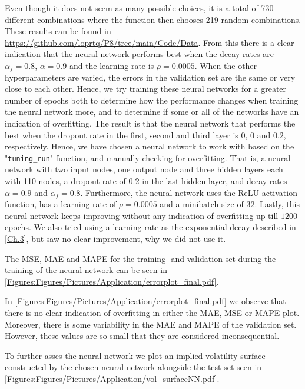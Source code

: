 Even though it does not seem as many possible choices, it is a total of 730 different combinations where the function then chooses 219 random combinations. These results can be found in \url{https://github.com/loprtq/P8/tree/main/Code/Data}. From this there is a clear indication that the neural network performs best when the decay rates are $\alpha_f = 0.8$, $\alpha = 0.9$ and the learning rate is $\rho = 0.0005$. When the other hyperparameters are varied, the errors in the validation set are the same or very close to each other. Hence, we try training these neural networks for a greater number of epochs both to determine how the performance changes when training the neural network more, and to determine if some or all of the networks have an indication of overfitting. The result is that the neural network that performs the best when the dropout rate in the first, second and third layer is $0$, $0$ and $0.2$, respectively. Hence, we have chosen a neural network to work with based on the "\lstinline{tuning_run}" function, and manually checking for overfitting. That is, a neural network with two input nodes, one output node and three hidden layers each with 110 nodes, a dropout rate of $0.2$ in the last hidden layer, and decay rates $\alpha = 0.9$ and $\alpha_f = 0.8$. Furthermore, the neural network uses the ReLU activation function, has a learning rate of $\rho = 0.0005$ and a minibatch size of $32$. Lastly, this neural network keeps improving without any indication of overfitting up till $1200$ epochs. We also tried using a learning rate as the exponential decay described in \autoref{Ch.3}, but saw no clear improvement, why we did not use it.

The MSE, MAE and MAPE for the training- and validation set during the training of the neural network can be seen in \autoref{Figures:Figures/Pictures/Application/errorplot_final.pdf}.

In \autoref{Figures:Figures/Pictures/Application/errorplot_final.pdf} we observe that there is no clear indication of overfitting in either the MAE, MSE or MAPE plot. Moreover, there is some variability in the MAE and MAPE of the validation set. However, these values are so small that they are considered inconsequential. 

To further asses the neural network we plot an implied volatility surface constructed by the chosen neural network alongside the test set seen in \autoref{Figures:Figures/Pictures/Application/vol_surfaceNN.pdf}. 

